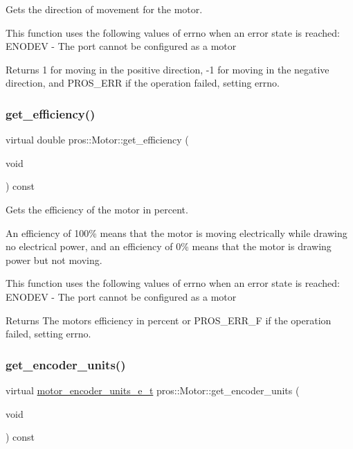 Gets the direction of movement for the motor. 

This function uses the following values of errno when an error state is reached\+: E\+N\+O\+D\+EV -\/ The port cannot be configured as a motor

\begin{DoxyReturn}{Returns}
1 for moving in the positive direction, -\/1 for moving in the negative direction, and P\+R\+O\+S\+\_\+\+E\+RR if the operation failed, setting errno. 
\end{DoxyReturn}
\mbox{\label{classpros_1_1Motor_a6f0b39894abf612a1965a66224893c71}} 
\subsubsection{\texorpdfstring{get\+\_\+efficiency()}{get\_efficiency()}}
{\footnotesize\ttfamily virtual double pros\+::\+Motor\+::get\+\_\+efficiency (\begin{DoxyParamCaption}\item[{void}]{ }\end{DoxyParamCaption}) const\hspace{0.3cm}{\ttfamily [virtual]}}



Gets the efficiency of the motor in percent. 

An efficiency of 100\% means that the motor is moving electrically while drawing no electrical power, and an efficiency of 0\% means that the motor is drawing power but not moving.

This function uses the following values of errno when an error state is reached\+: E\+N\+O\+D\+EV -\/ The port cannot be configured as a motor

\begin{DoxyReturn}{Returns}
The motor\textquotesingle{}s efficiency in percent or P\+R\+O\+S\+\_\+\+E\+R\+R\+\_\+F if the operation failed, setting errno. 
\end{DoxyReturn}
\mbox{\label{classpros_1_1Motor_a9fd37f3efa2f903bda8bf575b0052fd2}} 
\subsubsection{\texorpdfstring{get\+\_\+encoder\+\_\+units()}{get\_encoder\_units()}}
{\footnotesize\ttfamily virtual \hyperlink{motors_8h_a6677ba23760c558fd8b7b4e1e00a6123}{motor\+\_\+encoder\+\_\+units\+\_\+e\+\_\+t} pros\+::\+Motor\+::get\+\_\+encoder\+\_\+units (\begin{DoxyParamCaption}\item[{void}]{ }\end{DoxyParamCaption}) const\hspace{0.3cm}{\ttfamily [virtual]}}



